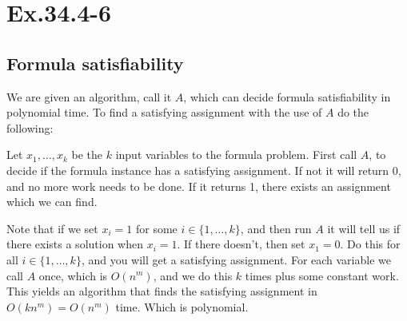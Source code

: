 \section*{Ex.34.4-6}
\subsection*{Formula satisfiability}

We are given an algorithm, call it $A$, which can decide formula satisfiability in polynomial time. To find a satisfying assignment with the use of $A$ do the following:

Let $x_1,\ldots,x_k$ be the $k$ input variables to the formula problem. First call $A$, to decide if the formula instance has a satisfying assignment. If not it will return 0, and no more work needs to be done. If it returns 1, there exists an assignment which we can find.

Note that if we set $x_i=1$ for some $i\in\{1,\ldots,k\}$, and then run $A$ it will tell us if there exists a solution when $x_i=1$. If there doesn't, then set $x_1 =0$. Do this for all $i\in\{1,\ldots,k\}$, and you will get a satisfying assignment. For each variable we call $A$ once, which is $O(n^m)$, and we do this $k$ times plus some constant work. This yields an algorithm that finds the satisfying assignment in $O(kn^m)=O(n^m)$ time. Which is polynomial.

